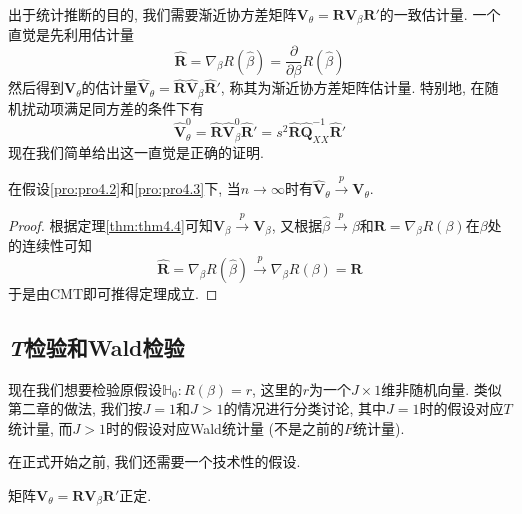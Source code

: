 \documentclass[cn, 12pt, math=mtpro2, bibstyle=apa, blue, twocol]{elegantbook}
\newcommand{\RH}{\mathbold{R}}
\newcommand{\hb}{\hat{\beta}}
\newcommand{\HH}{\mathbb{H}}
\newcommand{\V}{\mathbold{V}}
\begin{document}
出于统计推断的目的, 我们需要渐近协方差矩阵$\V_\theta=\RH\V_\beta\RH'$的一致估计量. 一个直觉是先利用估计量
\begin{equation}\label{eq4.16}
  \hat{\RH}=\nabla_\beta R(\hb)=\frac{\partial}{\partial\beta}R(\hat{\beta})
\end{equation}
然后得到$\V_\theta$的估计量$\hat{\V}_\theta=\hat{\RH}\hat{\V}_\beta\hat{\RH}'$, 称其为渐近协方差矩阵估计量. 特别地, 在随机扰动项满足同方差的条件下有
$$\hat{\V}_\theta^0=\hat{\RH}\hat{\V}_\beta^0\hat{\RH}'=s^2\hat{\RH}\hat{\mathbold{Q}}_{XX}^{-1}\hat{\RH}'$$
现在我们简单给出这一直觉是正确的证明.

\begin{theorem}\label{thm:thm4.6}
  在假设\ref{pro:pro4.2}和\ref{pro:pro4.3}下, 当$n\to\infty$时有$\hat{\V}_\theta\xrightarrow{p}\V_\theta$.
\end{theorem}
\begin{proof}
  根据定理\ref{thm:thm4.4}可知$\hat{\V}_\beta\xrightarrow{p}\V_\beta$, 又根据$\hb\xrightarrow{p}\beta$和$\RH=\displaystyle\nabla_\beta R(\beta)$在$\beta$处的连续性可知
  $$\hat{\RH}=\nabla_\beta R(\hb)\xrightarrow{p}\nabla_\beta R(\beta)=\RH$$
  于是由CMT即可推得定理成立.
\end{proof}
\subsection{\emph{T}检验和Wald检验}
现在我们想要检验原假设$\HH_0: R(\beta)=r$, 这里的$r$为一个$J\times1$维非随机向量. 类似第二章的做法, 我们按$J=1$和$J>1$的情况进行分类讨论, 其中$J=1$时的假设对应$T$统计量, 而$J>1$时的假设对应Wald统计量 (不是之前的$F$统计量).

在正式开始之前, 我们还需要一个技术性的假设.
\begin{proposition}\label{pro:pro4.4}
矩阵$\V_\theta=\RH\V_\beta\RH'$正定.
\end{proposition}
\end{document}
